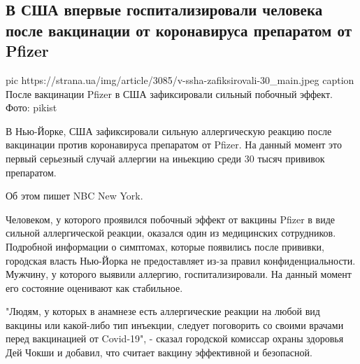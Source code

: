  
 
 
 
 
 
\subsection{В США впервые госпитализировали человека после вакцинации от коронавируса препаратом от Pfizer}
\label{sec:24_12_2020.news.ua.strana.1.pfizer_vaccine_allergy}

\ifcmt
pic https://strana.ua/img/article/3085/v-ssha-zafiksirovali-30_main.jpeg
caption После вакцинации Pfizer в США зафиксировали сильный побочный эффект. Фото: pikist 
\fi


В Нью-Йорке, США зафиксировали сильную аллергическую реакцию после вакцинации
против коронавируса препаратом от Pfizer. На данный момент это первый серьезный
случай аллергии на иньекцию среди 30 тысяч прививок препаратом.

Об этом пишет NBC New York.

Человеком, у которого проявился побочный эффект от вакцины Pfizer в виде
сильной аллергической реакции, оказался один из медицинских сотрудников.
Подробной информации о симптомах, которые появились после прививки, городская
власть Нью-Йорка не предоставляет из-за правил конфиденциальности. Мужчину, у
которого выявили аллергию, госпитализировали. На данный момент его состояние
оценивают как стабильное.

"Людям, у которых в анамнезе есть аллергические реакции на любой вид вакцины
или какой-либо тип инъекции, следует поговорить со своими врачами перед
вакцинацией от Covid-19", - сказал городской комиссар охраны здоровья Дей Чокши
и добавил, что считает вакцину эффективной и безопасной.

